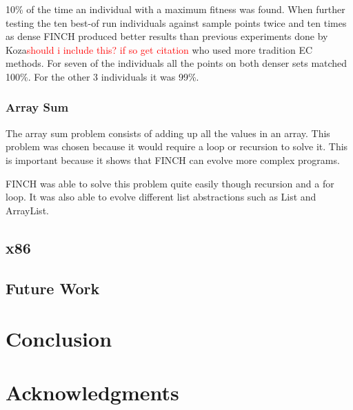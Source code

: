 \documentclass{sig-alternate}
\newcommand{\mycomment}[1]{\textcolor{red}{#1}}
\begin{document}
	10\% of the time an individual with a maximum fitness was found. When further testing the ten best-of run individuals against sample points twice and ten times as dense FINCH produced better results than previous experiments done by Koza\mycomment{should i include this? if so get citation} who used more tradition EC methods. For seven of the individuals all the points on both denser sets matched 100\%. For the other 3 individuals it was 99\%. 
\subsubsection{Array Sum}
The array sum problem consists of adding up all the values in an array. This problem was chosen because it would require a loop or recursion to solve it. This is important because it shows that FINCH can evolve more complex programs.\par
FINCH was able to solve this problem quite easily though recursion and a for loop. It was also able to evolve different list abstractions such as List and ArrayList.


\subsection{x86}






\subsection{Future Work}

\section{Conclusion}


\section{Acknowledgments}


%

%
%
\end{document}
